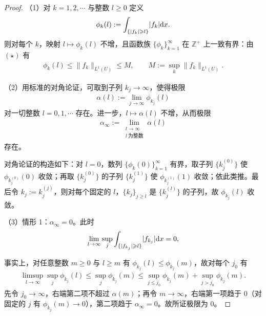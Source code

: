 \documentclass[../../main.tex]{subfiles}%
\begin{document}
\begin{proof}
（1）对 $k=1,2,\cdots$ 与整数 $l\geqslant0$ 定义
\begin{align*}
\phi_k(l):=\int_{\{\lvert f_k\rvert\geqslant l\}}\lvert f_k\rvert\mathrm{d} x .
\end{align*}
则对每个 $k$，映射 $l\mapsto\phi_k(l)$ 不增，且函数族 $\{\phi_k\}_{k=1}^{\infty}$ 在 $\mathbb{Z}^+$ 上一致有界：由 $(\star)$ 有
\begin{align*}
\phi_k(l)\leqslant\lVert f_k\rVert_{L^1(U)}\leqslant M,\qquad M:=\sup_k\lVert f_k\rVert_{L^1(U)} .
\end{align*}

（2）用标准的对角论证，可取到子列 $k_j\to\infty$，使得极限
\begin{align*}
\alpha(l):=\lim_{j\to\infty}\phi_{k_j}(l)
\end{align*}
对一切整数 $l=0,1,\cdots$ 存在。进一步，$l\mapsto\alpha(l)$ 不增，从而极限
\begin{align*}
\alpha_\infty:=\lim_{\substack{l\to\infty\\ l\ \text{为整数}}}\alpha(l)
\end{align*}
存在。

对角论证的构造如下：对 $l=0$，数列 $\{\phi_k(0)\}_{k=1}^{\infty}$ 有界，取子列 $\{k_j^{(0)}\}$ 使 $\phi_{k_j^{(0)}}(0)$ 收敛；再取 $\{k_j^{(0)}\}$ 的子列 $\{k_j^{(1)}\}$ 使 $\phi_{k_j^{(1)}}(1)$ 收敛；依此类推。最后令 $k_j:=k_j^{(j)}$，则对每个固定的 $l$，$\{k_j\}_{j\geqslant l}$ 是 $\{k_j^{(l)}\}$ 的子列，故 $\phi_{k_j}(l)$ 收敛。

（3）情形 1：$\alpha_\infty=0$。此时
\begin{align*}
\lim_{l\to\infty}\sup_j\int_{\{\lvert f_{k_j}\rvert\geqslant l\}}\lvert f_{k_j}\rvert\mathrm{d} x=0,
\end{align*}

事实上，对任意整数 $m\geqslant0$ 与 $l\geqslant m$ 有 $\phi_{k_j}(l)\leqslant\phi_{k_j}(m)$，故对每个 $j_0$ 有
\begin{align*}
\limsup_{l\to\infty}\sup_j\phi_{k_j}(l)\leqslant\sup_j\phi_{k_j}(m)\leqslant\sup_{j\leqslant j_0}\phi_{k_j}(m)+\sup_{j>j_0}\phi_{k_j}(m).
\end{align*}
先令 $j_0\to\infty$，右端第二项不超过 $\alpha(m)$；再令 $m\to\infty$，右端第一项趋于 $0$（对固定的 $j$ 有 $\phi_{k_j}(m)\to0$），第二项趋于 $\alpha_\infty=0$。故所证极限为 $0$。


\end{proof}
\end{document}
